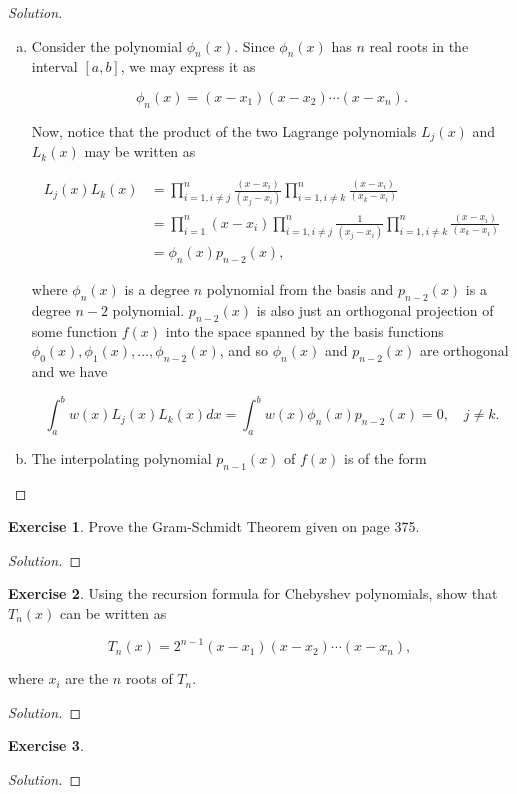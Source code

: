 \documentclass[12pt,a4]{article}
\theoremstyle{definition}
\newtheorem{exercise}{Exercise}
\begin{document}
\begin{proof}[Solution]
	\begin{enumerate}[(a)]
		\item Consider the polynomial $\phi_n(x)$. Since $\phi_n(x)$ has $n$ real roots in the interval $[a, b]$, we may express it as 
		
		\[
		\phi_n(x) = (x - x_1) (x - x_2) \cdots (x - x_n) {.}
		\]
		
		\noindent Now, notice that the product of the two Lagrange polynomials $L_j(x)$ and $L_k(x)$ may be written as 
		
		\begin{align*}
		L_j(x) L_k(x) &= \prod_{i = 1, i \neq j}^n \frac{(x - x_i)}{(x_j - x_i)} \prod_{i = 1, i \neq k}^n \frac{(x - x_i)}{(x_k - x_i)} \\
		 &= \prod_{i = 1}^n (x - x_i) \prod_{i = 1, i \neq j}^n \frac{1}{(x_j - x_i)} \prod_{i = 1, i \neq k}^n \frac{(x - x_i)}{(x_k - x_i)} \\
		 &= \phi_n(x) p_{n - 2}(x) {,}
		\end{align*}
		
		\noindent where $\phi_n(x)$ is a degree $n$ polynomial from the basis and $p_{n - 2}(x)$ is a degree $n - 2$ polynomial. $p_{n - 2}(x)$ is also just an orthogonal projection of some function $f(x)$ into the space spanned by the basis functions $\phi_0(x), \phi_1(x), \ldots, \phi_{n - 2}(x)$, and so $\phi_n(x)$ and $p_{n - 2}(x)$ are orthogonal and we have
		
		\[
		\int_a^b w(x) L_j(x) L_k(x) dx = \int_a^b w(x) \phi_n(x) p_{n - 2}(x) = 0 {,} \quad j \neq k {.}
		\]
		
		\item The interpolating polynomial $p_{n - 1}(x)$ of $f(x)$ is of the form 
	\end{enumerate}
\end{proof}

\begin{exercise}
	Prove the Gram-Schmidt Theorem given on page 375. 
\end{exercise}
\begin{proof}[Solution]
	
\end{proof}

\begin{exercise}
	Using the recursion formula for Chebyshev polynomials, show that $T_n(x)$ can be written as
	
	\[
	T_n(x) = 2^{n - 1} (x - x_1) (x - x_2) \cdots (x - x_n) {,}
	\]
	
	\noindent where $x_i$ are the $n$ roots of $T_n$. 
\end{exercise}
\begin{proof}[Solution]
	
\end{proof}

\begin{exercise}
	
\end{exercise}
\begin{proof}[Solution]
	
\end{proof}
\end{document}
